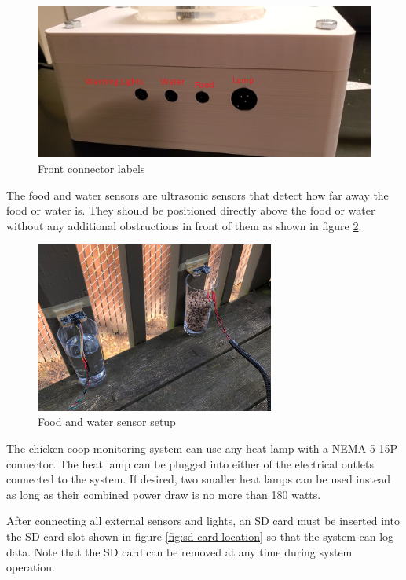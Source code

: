 \documentclass{article}
\begin{document}
\begin{figure}[H]
    \centering
    \includegraphics[width=\textwidth]{fig/panel-labels.png}
    \caption{Front connector labels}
    \label{fig:front-connector}
\end{figure}

The food and water sensors are ultrasonic sensors that detect how far away the food or water is.  They should be positioned directly above the food or water without any additional obstructions in front of them as shown in figure \ref{fig:sensor-setup}.

\begin{figure}[H]
    \centering
    \includegraphics[width=0.7\textwidth]{fig/sensor-setup.jpg}
    \caption{Food and water sensor setup}
    \label{fig:sensor-setup}
\end{figure}

The chicken coop monitoring system can use any heat lamp with a NEMA 5-15P connector.  The heat lamp can be plugged into either of the electrical outlets connected to the system.  If desired, two smaller heat lamps can be used instead as long as their combined power draw is no more than 180 watts.

After connecting all external sensors and lights, an SD card must be inserted into the SD card slot shown in figure \ref{fig:sd-card-location} so that the system can log data.  Note that the SD card can be removed at any time during system operation.
\end{document}
